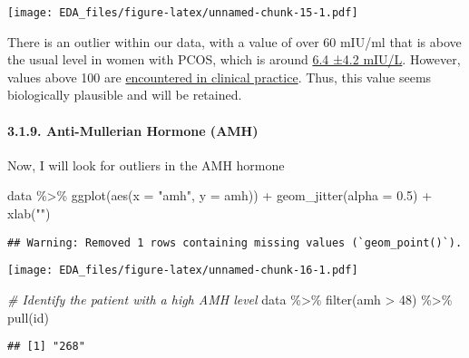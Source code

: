 \documentclass[
]{article}
\newenvironment{Shaded}{\begin{snugshade}}{\end{snugshade}}
\newcommand{\AttributeTok}[1]{\textcolor[rgb]{0.77,0.63,0.00}{#1}}
\newcommand{\CommentTok}[1]{\textcolor[rgb]{0.56,0.35,0.01}{\textit{#1}}}
\newcommand{\DecValTok}[1]{\textcolor[rgb]{0.00,0.00,0.81}{#1}}
\newcommand{\FloatTok}[1]{\textcolor[rgb]{0.00,0.00,0.81}{#1}}
\newcommand{\FunctionTok}[1]{\textcolor[rgb]{0.00,0.00,0.00}{#1}}
\newcommand{\NormalTok}[1]{#1}
\newcommand{\SpecialCharTok}[1]{\textcolor[rgb]{0.00,0.00,0.00}{#1}}
\newcommand{\StringTok}[1]{\textcolor[rgb]{0.31,0.60,0.02}{#1}}
\begin{document}
\texttt{[image: EDA\_files/figure-latex/unnamed-chunk-15-1.pdf]}

There is an outlier within our data, with a value of over 60 mIU/ml that
is above the usual level in women with PCOS, which is around
\href{https://www.ncbi.nlm.nih.gov/pmc/articles/PMC7812530/}{6.4 ±4.2
mIU/L}. However, values above 100 are
\href{https://doi.org/10.3121/cmr.2016.1309}{encountered in clinical
practice}. Thus, this value seems biologically plausible and will be
retained.

\hypertarget{anti-mullerian-hormone-amh}{%
\paragraph{3.1.9. Anti-Mullerian Hormone
(AMH)}\label{anti-mullerian-hormone-amh}}

Now, I will look for outliers in the AMH hormone

\begin{Shaded}
\begin{Highlighting}[]
\NormalTok{data }\SpecialCharTok{\%\textgreater{}\%} 
  \FunctionTok{ggplot}\NormalTok{(}\FunctionTok{aes}\NormalTok{(}\AttributeTok{x =} \StringTok{"amh"}\NormalTok{, }\AttributeTok{y =}\NormalTok{ amh)) }\SpecialCharTok{+}
  \FunctionTok{geom\_jitter}\NormalTok{(}\AttributeTok{alpha =} \FloatTok{0.5}\NormalTok{) }\SpecialCharTok{+}
  \FunctionTok{xlab}\NormalTok{(}\StringTok{""}\NormalTok{)}
\end{Highlighting}
\end{Shaded}

\begin{verbatim}
## Warning: Removed 1 rows containing missing values (`geom_point()`).
\end{verbatim}

\texttt{[image: EDA\_files/figure-latex/unnamed-chunk-16-1.pdf]}

\begin{Shaded}
\begin{Highlighting}[]
\CommentTok{\# Identify the patient with a high AMH level}
\NormalTok{data }\SpecialCharTok{\%\textgreater{}\%} 
  \FunctionTok{filter}\NormalTok{(amh }\SpecialCharTok{\textgreater{}} \DecValTok{48}\NormalTok{) }\SpecialCharTok{\%\textgreater{}\%} 
  \FunctionTok{pull}\NormalTok{(id)}
\end{Highlighting}
\end{Shaded}

\begin{verbatim}
## [1] "268"
\end{verbatim}
\end{document}
